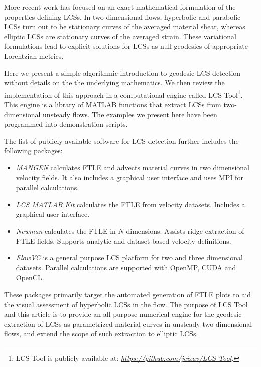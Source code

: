 \documentclass{article}
\begin{document}
More recent work has focused on an exact mathematical formulation of the properties defining LCSs\parencite{haller11:_lagran_coher_struc,farazmand12:_comput_lagran,haller12:_geodes_theor_trans_barrier_two_dimen_flows,haller13:_coher_lagran,blazevski14:_hyper_ellip_trans_barrier_three}. In two-dimensional flows, hyperbolic and parabolic LCSs turn out to be stationary curves of the averaged material shear\parencite{farazmand14:_shearless}, whereas elliptic LCSs are stationary curves of the averaged
strain\parencite{haller13:_coher_lagran}. These variational formulations lead to explicit solutions for LCSs as null-geodesics of appropriate Lorentzian metrics.

Here we present a simple algorithmic introduction to geodesic LCS detection without details on the the underlying mathematics. We then review the implementation of this approach in a computational engine called LCS Tool\footnote{LCS Tool is publicly available at: \emph{\url{https://github.com/jeixav/LCS-Tool}}.}. This engine is a library of MATLAB functions that extract LCSs from two-dimensional unsteady flows. The examples we present here have been programmed into demonstration scripts.

The list of publicly available software for LCS detection further
includes the following packages:
\begin{itemize}
\item \emph{MANGEN}\parencite{lekien03:_time} calculates FTLE and advects material curves in two dimensional velocity fields. It also includes a graphical user interface and uses MPI for parallel calculations.
\item \emph{LCS MATLAB Kit}\parencite{dabiri09:_lmk} calculates the FTLE from velocity datasets. Includes a graphical user interface.
\item \emph{Newman}\parencite{toit10:_trans} calculates the FTLE in $N$ dimensions. Assists ridge extraction of FTLE fields. Supports analytic  and dataset based velocity definitions.
\item \emph{FlowVC}\parencite{shadden10:_flowvc} is a general purpose LCS platform for two and three dimensional datasets. Parallel calculations are supported with Open\-MP, CUDA and OpenCL.
\end{itemize}
These packages primarily target the automated generation of FTLE plots to aid the visual assessment of hyperbolic LCSs in the flow. The purpose of LCS Tool and this article is to provide an all-purpose numerical engine for the geodesic extraction of LCSs as parametrized material curves in unsteady two-dimensional flows, and extend the scope of such extraction to elliptic LCSs.
\end{document}
